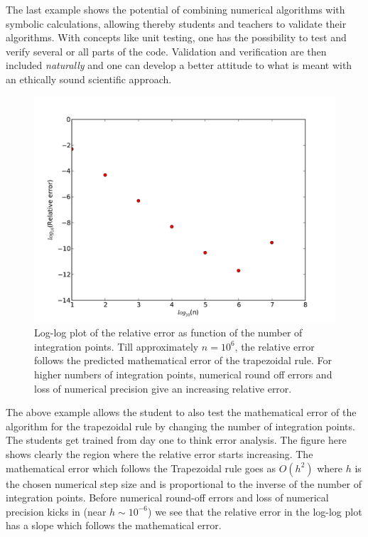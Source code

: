 \documentclass[graybox,envcountchap,sectrefs]{svmult}
\begin{document}
The last example shows the potential of combining numerical algorithms
with symbolic calculations, allowing thereby students and teachers to
validate their algorithms. With concepts like unit testing, one has
the possibility to test and verify several or all parts of the
code. Validation and verification are then included \emph{naturally}
and one can develop a better attitude to what is meant with an
ethically sound scientific approach.
\begin{figure}
\includegraphics[scale=0.8]{Figures/error.pdf}
\caption{Log-log plot of the relative error as function of the number of integration points. Till approximately $n=10^6$, the relative error follows the predicted mathematical error of the trapezoidal rule. For higher numbers of integration points, numerical round off errors and loss of numerical precision give an increasing relative error.}
\end{figure}

The above example allows the student to also test the mathematical
error of the algorithm for the trapezoidal rule by changing the number
of integration points. The students get trained from day one to think
error analysis. The figure here shows clearly the region where the
relative error starts increasing.  The mathematical error which
follows the Trapezoidal rule goes as $O(h^2)$ where $h$ is the chosen
numerical step size and is proportional to the inverse of the number of integration points. 
Before numerical round-off errors and loss of
numerical precision kicks in (near $h\sim 10^{-6}$) we see that the
relative error in the log-log plot has a slope which follows the
mathematical error.  
\end{document}
